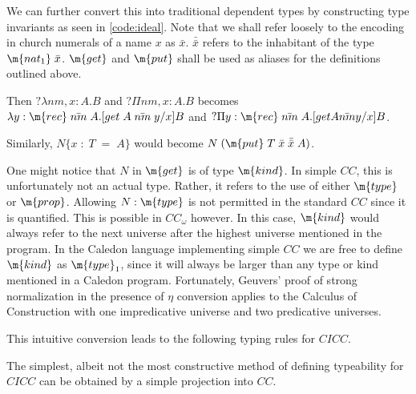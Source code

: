 We can further convert this into traditional dependent types by constructing
 type invariants as seen in \ref{code:ideal}.   Note that we shall refer loosely 
to the encoding in church numerals of a name $x$ as $\bar{x}$.  $\bar{\bar{x}}$ refers to the 
inhabitant of the type $\m{nat_1}\;\bar{x}$.   $\m{get}$ and $\m{put}$ shall be used as 
aliases for the definitions outlined above.

Then $?\lambda nm,x : A . B$ and $?\Pi nm,x : A . B$ 
becomes $\lambda y : \m{rec}\;\bar{nm}\;A . [get \;A \;\bar{nm}\; y / x ] B$
and $?\Pi y : \m{rec}\;\bar{nm}\;A . [get A \bar{nm} y / x ] B$.

Similarly, $N \{ x\; : \; T \; = \;A \} $
would become $N\;( \m{put} \; T \; \bar{x} \; \bar{\bar{x}} \; A)$.

One might notice that $N$ in $\m{get}$ is of type $\m{kind}$.  
In simple $CC$, this is unfortunately not an actual type. 
Rather, it refers to the use of either $\m{type}$ or $\m{prop}$.  
Allowing $N : \m{type}$ is not permitted in the standard $CC$ since it is quantified.
This is possible in $CC_\omega$ however.
In this case, $\m{kind}$ would always refer to the next universe after the highest
universe mentioned in the program.
In the Caledon language implementing simple $CC$ we are free to define 
$\m{kind}$ as $\m{type}_1$, since it will always be larger than any
type or kind mentioned in a Caledon program.  
Fortunately, Geuvers' proof \citep{geuvers1993logics} of strong normalization in the presence of 
$\eta$ conversion applies to the Calculus of Construction with one impredicative universe and two predicative
universes.

This intuitive conversion leads to the following typing rules for $CICC$.


The simplest, albeit not the most constructive method of defining typeability for $CICC$ can be obtained by a simple projection into $CC$.

\newcommand{\CICCproj}[1]{ \left\llbracket #1 \right\rrbracket_{ci}}

